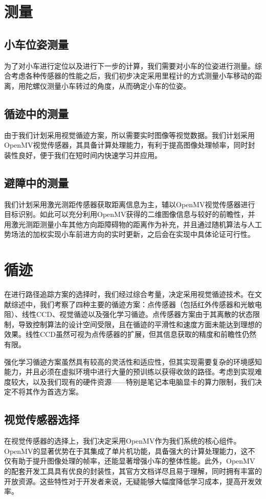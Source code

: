\documentclass{report}
\begin{document}
\section{测量}
\label{sec:label}
\subsection{小车位姿测量}
\label{subsec:label}
为了对小车进行定位以及进行下一步的计算，我们需要对小车的位姿进行测量。综合考虑各种传感器的性能之后，我们初步决定采用里程计的方式测量小车移动的距离，用陀螺仪测量小车转过的角度，从而确定小车的位姿。
\subsection{循迹中的测量}
\label{subsec:label}
由于我们计划采用视觉循迹方案，所以需要实时图像等视觉数据。我们计划采用OpenMV视觉传感器，其具备计算处理能力，有利于提高图像处理帧率，同时封装性良好，便于我们在短时间内快速学习并应用。
\subsection{避障中的测量}
\label{subsec:label}
我们计划采用激光测距传感器获取距离信息为主，辅以OpenMV视觉传感器进行目标识别。如此可以充分利用OpenMV获得的二维图像信息与较好的前瞻性，并用激光测距测量小车其他方向距障碍物的距离作为补充，并且通过随机算法与人工势场法的加权实现小车前进方向的实时更新，之后会在实现中具体论证可行性。
\section{循迹}
\label{sec:label}

在进行路径追踪方案的选择时，我们经过综合考量，决定采用视觉循迹技术。在文献综述中，我们考察了四种主要的循迹方案：点传感器（包括红外传感器和光敏电阻）、线性CCD、视觉循迹以及强化学习循迹。点传感器方案由于其离散的状态限制，导致控制算法的设计空间受限，且在循迹的平滑性和速度方面未能达到理想的效果。线性CCD虽然可视为点传感器的扩展，但其信息获取的精度和前瞻性仍然有限。

强化学习循迹方案虽然具有较高的灵活性和适应性，但其实现需要复杂的环境感知能力，并且必须在虚拟环境中进行大量的预训练以获得收敛的路径。考虑到实现难度较大，以及我们现有的硬件资源——特别是笔记本电脑显卡的算力限制，我们决定不将其作为首选方案。
\subsection{视觉传感器选择}
\label{subsec:label}
在视觉传感器的选择上，我们决定采用OpenMV作为我们系统的核心组件。OpenMV的显著优势在于其集成了单片机功能，具备强大的计算处理能力，这不仅有助于提升图像处理的帧率，还能显著增强小车的整体性能。此外，OpenMV的配套开发工具具有优良的封装性，其官方文档详尽且易于理解，同时拥有丰富的开放资源。这些特性对于开发者来说，无疑能够大幅度降低学习成本，提高开发效率。
\end{document}
